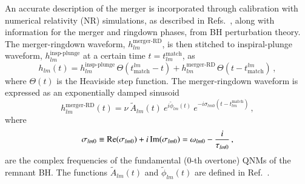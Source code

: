 \documentclass[twocolumn,
               prd,
               aps,
               superscriptaddress,
               tightenlines,
               nofootinbib,
               eqsecnum,
               amsfonts,
               amsmath,
               longbibliography]{revtex4-1}
\newcommand{\ag}[1]{{\textcolor{Maroon}{{#1}}}}
\begin{document}
An accurate description of the merger is incorporated through calibration with
numerical relativity (NR) simulations, as described in Refs.~\cite{Bohe:2016gbl,Cotesta:2018fcv}, along with
information for the merger and ringdown phases, from BH perturbation theory.
The merger-ringdown waveform, $h_{l m}^\textrm{merger-RD}$, is then stitched to
inspiral-plunge waveform, $h_{l m}^\textrm{insp-plunge}$ at a certain time $t = t^{\textrm{match}}_{l m}$, as
%
\begin{equation}
h_{l m}(t) =
h_{l m}^\textrm{insp-plunge}\, \Theta(t_\textrm{match}^{l m} - t)
+ h_{l m}^\textrm{merger-RD}\,\Theta(t-t_\textrm{match}^{l m})\,,
\end{equation}
%
where $\Theta(t)$ is the Heaviside step function.
%
The merger-ringdown waveform is expressed as an exponentially damped
sinusoid~\cite{Bohe:2016gbl,Cotesta:2018fcv}
%
\begin{equation}
\label{RD}
h_{l m}^{\textrm{merger-RD}}(t) = \nu \ \tilde{A}_{l m}(t)\ e^{i \tilde{\phi}_{l m}(t)} \ e^{-i \sigma_{l m 0}(t-t^{\textrm{match}}_{l m})}\,,
\end{equation}
%
where
%
\begin{align}
\sigma_{l m 0} \equiv {\rm Re}(\sigma_{l m 0}) + i \, {\rm Im}(\sigma_{l m 0})
= \omega_{l m 0} - \frac{i}{\tau_{l m 0}}\,,
\end{align}
%
are the complex frequencies of the fundamental ($0$-th overtone) QNMs of the remnant BH.
%
%
The functions $\tilde{A}_{l m}(t)$ and $\tilde{\phi}_{l m}(t)$ are defined
in Ref.~\cite{Bohe:2016gbl,Cotesta:2018fcv}.
\end{document}
